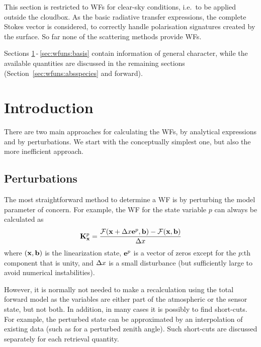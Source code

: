 This section is restricted to WFs for clear-sky conditions, i.e.\ to be applied
outside the cloudbox. As the basic radiative transfer expressions, the complete
Stokes vector is considered, to correctly handle polarisation signatures
created by the surface. So far none of the scattering methods provide WFs.

Sections \ref{sec:wfuns:intro}\,-\,\ref{sec:wfuns:basis} contain information
of general character, while the available quantities are discussed in the
remaining sections (Section~\ref{sec:wfuns:absspecies} and forward).



\section{Introduction}
\label{sec:wfuns:intro}
%
There are two main approaches for calculating the WFs, by analytical
expressions and by perturbations. We start with the conceptually simplest one,
but also the more inefficient approach.



\subsection{Perturbations}
\label{sec:wfuns:pert}
%
The most straightforward method to determine a WF is by perturbing the model
parameter of concern. For example, the WF for the state variable $p$ can always
be calculated as
\begin{equation}
  \mathbf{K}_{\mathbf{x}}^p = \frac{\mathcal{F}(\mathbf{x}+\Delta x\mathbf{e}^p,
                      \mathbf{b})-\mathcal{F}(\mathbf{x},\mathbf{b})} {\Delta x}
 \label{eq:wfuns:perturb}
\end{equation}
where $(\mathbf{x},\mathbf{b})$ is the linearization state, $\mathbf{e}^p$ is a
vector of zeros except for the $p$:th component that is unity, and
$\Delta x$ is a small disturbance (but sufficiently large to avoid
numerical instabilities).

However, it is normally not needed to make a recalculation using the total
forward model as the variables are either part of the atmospheric or the sensor
state, but not both. In addition, in many cases it is possibly to find
short-cuts. For example, the perturbed state can be approximated by an
interpolation of existing data (such as for a perturbed zenith angle). Such
short-cuts are discussed separately for each retrieval quantity.


